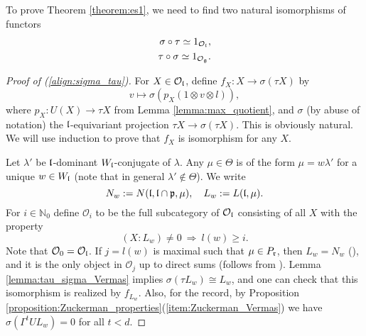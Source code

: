 \documentclass[a4paper,10pt]{article}
\begin{document}
To prove Theorem \ref{theorem:es1}, we need to find two natural isomorphisms of functors
%
\begin{align}
\label{align:sigma_tau} \sigma \circ \tau \simeq 1_{\mathcal{O}_{\mathfrak{l}}}, \\
\label{align:tau_sigma} \tau \circ \sigma \simeq 1_{\mathcal{O}_{\mathfrak{g}}}.
\end{align}
%
\begin{proof}[Proof of (\ref{align:sigma_tau})]
For $X \in \mathcal{O}_{\mathfrak{l}}$, define $f_X \colon X \to \sigma (\tau X)$ by
%
\[ v \mapsto \sigma \left( p_X(1 \otimes v \otimes l) \right), \]
%
where $p_X \colon U(X) \to \tau X$ from Lemma \ref{lemma:max_quotient}, and $\sigma$ (by abuse of notation) the $\mathfrak{l}$-equivariant projection $\tau X \to \sigma(\tau X)$. This is obviously natural. We will use induction to prove that $f_X$ is isomorphism for any $X$.

Let $\lambda'$ be $\mathfrak{l}$-dominant $W_{\mathfrak{l}}$-conjugate of $\lambda$. Any $\mu \in \Theta$ is of the form $\mu = w \lambda'$ for a unique $w \in W_{\mathfrak{l}}$ (note that in general $\lambda' \notin \Theta$). We write
%
\[ N_w := N(\mathfrak{l,l\cap p},\mu), \quad L_w := L(\mathfrak{l},\mu). \]
%
For $i \in \mathbb{N}_0$ define $\mathcal{O}_i$ to be the full subcategory of $\mathcal{O}_{\mathfrak{l}}$ consisting of all $X$ with the property
%
\[ (X \colon L_w) \neq 0 \ \Rightarrow \ l(w) \geq i. \]
%
Note that $\mathcal{O}_0 = \mathcal{O}_{\mathfrak{l}}$. If $j=l(w)$ is maximal such that $\mu \in P_{\mathfrak{r}}$, then $L_w = N_w$ (\cite[Theorem 9.12.]{hum}), and it is the only object in $\mathcal{O}_j$ up to direct sums (follows from \cite[Proposition 3.1.(d)]{hum}). Lemma \ref{lemma:tau_sigma_Vermas} implies $\sigma(\tau L_w) \cong L_w$, and one can check that this isomorphism is realized by $f_{L_w}$. Also, for the record, by Proposition \ref{proposition:Zuckerman_properties}(\ref{item:Zuckerman_Vermas}) we have $\sigma (\Gamma^t U L_w) =0$ for all $t<d$.


\end{proof}
\end{document}
